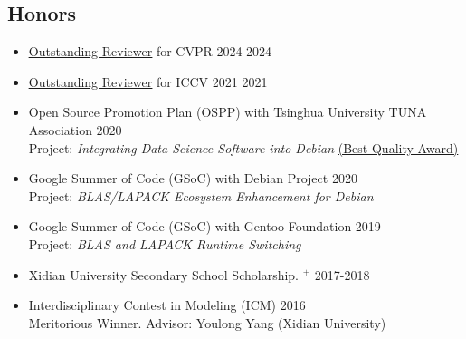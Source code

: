 \documentclass[10pt,margin,line,pifont,palatino,courier]{res}
\begin{document}
\begin{resume}
\section{\sc Honors}

\begin{itemize}[leftmargin=*]
    \item \href{https://cvpr.thecvf.com/Conferences/2024/ProgramCommittee}{\underline{Outstanding Reviewer}} for CVPR 2024 \hfill 2024
	\item \href{http://iccv2021.thecvf.com/outstanding-reviewers}{\underline{Outstanding Reviewer}} for ICCV 2021 \hfill 2021
	\item Open Source Promotion Plan (OSPP) with Tsinghua University TUNA Association \hfill 2020\\
		{\small Project: \textit{Integrating Data Science Software into Debian} \href{https://isrc.iscas.ac.cn/summer2020/#/announcement}{(Best Quality Award)}}
	\item Google Summer of Code (GSoC) with Debian Project \hfill 2020\\
		{\small Project: \textit{BLAS/LAPACK Ecosystem Enhancement for Debian}}
	\item Google Summer of Code (GSoC) with Gentoo Foundation \hfill 2019\\
		{\small Project: \textit{BLAS and LAPACK Runtime Switching}}
	\item Xidian University Secondary School Scholarship.%
		\href{http://see.xidian.edu.cn/html/news/9732.html}{$^+$} \hfill 2017-2018
	\item Interdisciplinary Contest in Modeling (ICM) \hfill 2016\\
		{\small Meritorious Winner. Advisor: Youlong Yang (Xidian University)}
\end{itemize}

\end{resume}
\end{document}
